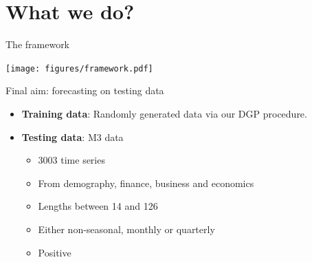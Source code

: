 \documentclass[11pt,ignorenonframetext,compress]{beamer}
\providecommand{\tightlist}{%
  \setlength{\itemsep}{0pt}\setlength{\parskip}{0pt}}
\begin{document}
\section{What we do?}\label{what-we-do}

\begin{frame}{The framework}

  \centerline{\texttt{[image: figures/framework.pdf]}}

\end{frame}

\begin{frame}{Final aim: forecasting on testing data}

  \begin{itemize}

  \item \textbf{Training data}: Randomly generated data via our DGP procedure.

  \item \textbf{Testing data}: M3 data \citep{makridakis2000m3}

    \begin{itemize}
      \tightlist
    \item
      3003 time series
    \item
      From demography, finance, business and economics
    \item
      Lengths between 14 and 126
    \item
      Either non-seasonal, monthly or quarterly
    \item
      Positive
    \end{itemize}

  \end{itemize}
\end{frame}



\end{document}
